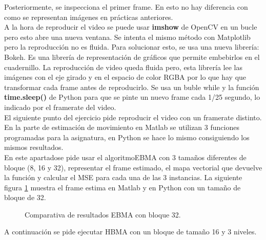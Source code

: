 \documentclass[a4paper,12pt]{report}
\begin{document}
Posteriormente, se inspecciona el primer frame. En esto no hay diferencia con como se representan imágenes en prácticas anteriores.\\

A la hora de reproducir el video se puede usar \textbf{imshow} de OpenCV en un bucle pero esto abre una nueva ventana. Se intenta el mismo método con Matplotlib pero la reproducción no es fluida. Para solucionar esto, se usa una nueva librería: Bokeh. Es una librería de representación de gráficos que permite embebirlos en el cuadernillo. La reproducción de video queda fluida pero, esta librería lee las imágenes con el eje girado y en el espacio de color RGBA por lo que hay que transformar cada frame antes de reproducirlo. Se usa un buble while y la función \textbf{time.sleep()} de Python para que se pinte un nuevo frame cada 1/25 segundo, lo indicado por el framerate del video.\\

El siguiente punto del ejercicio pide reproducir el video con un framerate distinto.\\

En la parte de estimación de movimiento en Matlab se utilizan 3 funciones programadas para la asignatura, en Python se hace lo mismo consiguiendo los mismos resultados. \\

En este apartadose pide usar el algoritmoEBMA con 3 tamaños diferentes de bloque (8, 16 y 32), representar el frame estimado, el mapa vectorial que devuelve la función y calcular el MSE para cada una de las 3 instancias. La siguiente figura \ref{ebma32} muestra el frame estima en Matlab y en Python con un tamaño de bloque de 32.\\

\begin{figure}[!tbp]
  \centering
  \hfill
  \caption{Comparativa de resultados EBMA con bloque 32.}
  \label{ebma32}
\end{figure}
A continuación se pide ejecutar HBMA con un bloque de tamaño 16 y 3 niveles.\\
\end{document}
